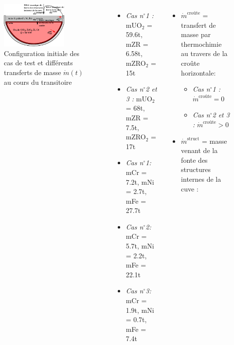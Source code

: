 \begin{frame}[fragile]
	\begin{columns}
	\begin{figure}
	\centering \includegraphics[width=0.75\textwidth]{Figures/cas_benchmark_ivmr.eps} \caption{\tiny Configuration initiale des cas de test et différents transferts de masse $\dot{m}(t)$ au cours du transitoire}
	\end{figure}
	\begin{itemize}
		\item {\tiny\emph{Cas n$^{\circ}$1 :} mUO$_2$ = 59.6t,  mZR = 6.58t, mZRO$_2$ = 15t}
		\item {\tiny\emph{Cas n$^{\circ}$2 et 3 :} mUO$_2$ = 68t,  mZR = 7.5t, mZRO$_2$ = 17t}
		\item {\tiny\emph{Cas n$^{\circ}$1:} mCr = 7.2t,  mNi = 2.7t, mFe = 27.7t}
		\item {\tiny\emph{Cas n$^{\circ}$2:} mCr = 5.7t,  mNi = 2.2t, mFe = 22.1t}
		\item {\tiny\emph{Cas n$^{\circ}$3:} mCr = 1.9t,  mNi = 0.7t, mFe = 7.4t}
	\end{itemize}
	\begin{itemize}
		\item $\dot{m}^{\text{croûte}}$ = transfert de masse par thermochimie au travers de la croûte horizontale:
			\begin{itemize}
				\item \emph{Cas n$^{\circ}$1 :} $\dot{m}^{\text{croûte}} = 0$
				\item \emph{Cas n$^{\circ}$2 et 3 :} $\dot{m}^{\text{croûte}} > 0$
			\end{itemize} 
		\item $\dot{m}^{\text{struct}}$ = masse venant de la fonte des structures internes de la cuve :
			\begin{itemize}

\end{itemize}
\end{itemize}
\end{columns}
\end{frame}
